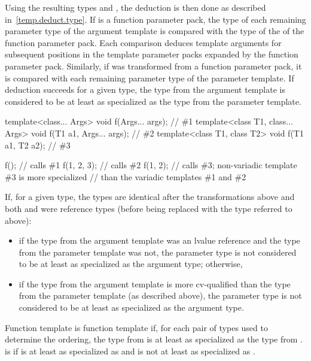 \pnum
Using the resulting types
and
,
the deduction is then done as described in~\ref{temp.deduct.type}.
If  is a function parameter pack, the type  of each remaining
parameter type of the argument template is compared with the type  of
the  of the function parameter pack. Each comparison
deduces template arguments for subsequent positions in the template parameter
packs expanded by the function parameter pack.
Similarly, if  was transformed from a function parameter pack,
it is compared with each remaining parameter type of the parameter template.
If deduction succeeds for a given type,
the type from the argument template is considered to be at least as specialized
as the type from the parameter template.
\begin{example}
\begin{codeblock}
template<class... Args>           void f(Args... args);         // \#1
template<class T1, class... Args> void f(T1 a1, Args... args);  // \#2
template<class T1, class T2>      void f(T1 a1, T2 a2);         // \#3

f();                // calls \#1
f(1, 2, 3);         // calls \#2
f(1, 2);            // calls \#3; non-variadic template \#3 is more specialized
                    // than the variadic templates \#1 and \#2
\end{codeblock}
\end{example}

\pnum
If, for a given type, the
types are identical after the transformations above
and both  and  were reference types (before being replaced with the
type referred to above):
\begin{itemize}
\item if the type from the argument template was an lvalue reference and the type
from the parameter template was not,
the parameter type is not considered to be
at least as specialized as the argument type; otherwise,
\item if the type from
the argument template is more cv-qualified than the type from the
parameter template (as described above),
the parameter type is not considered to be
at least as specialized as the argument type.
\end{itemize}

\pnum
{}%
Function template 
is 
function template  if,
for each pair of types used to determine the ordering,
the type from 
is at least as specialized as
the type from .
is 
 if
is at least as specialized as
 and
is not at least as specialized as
.

